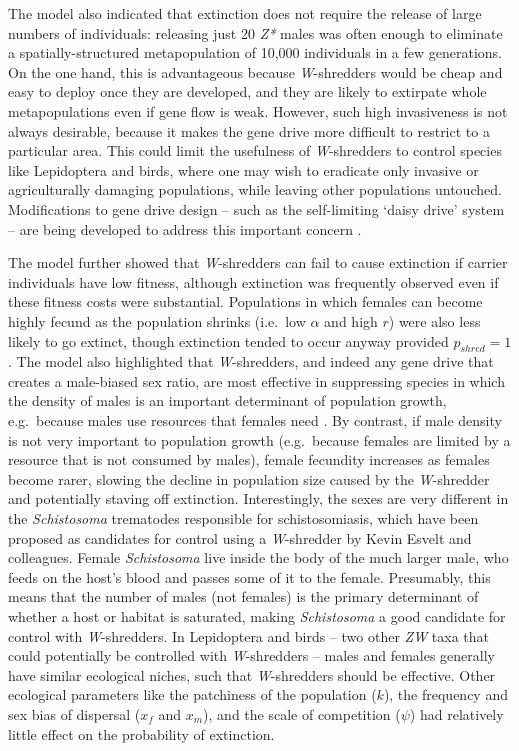 \documentclass[]{rsos}%
\begin{document}
The model also indicated that extinction does not require the release of
large numbers of individuals: releasing just 20 \emph{Z*} males was
often enough to eliminate a spatially-structured metapopulation of
10,000 individuals in a few generations. On the one hand, this is
advantageous because \emph{W}-shredders would be cheap and easy to
deploy once they are developed, and they are likely to extirpate whole
metapopulations even if gene flow is weak. However, such high
invasiveness is not always desirable, because it makes the gene drive
more difficult to restrict to a particular area. This could limit the
usefulness of \emph{W}-shredders to control species like Lepidoptera and
birds, where one may wish to eradicate only invasive or agriculturally
damaging populations, while leaving other populations untouched.
Modifications to gene drive design -- such as the self-limiting `daisy
drive' system -- are being developed to address this important concern
\citep{min2017da, noble2019da}.

The model further showed that \emph{W}-shredders can fail to cause
extinction if carrier individuals have low fitness, although extinction
was frequently observed even if these fitness costs were substantial.
Populations in which females can become highly fecund as the population
shrinks (i.e.~low \(\alpha\) and high \(r\)) were also less likely to go
extinct, though extinction tended to occur anyway provided
\(p_{shred} = 1\). The model also highlighted that \emph{W}-shredders,
and indeed any gene drive that creates a male-biased sex ratio, are most
effective in suppressing species in which the density of males is an
important determinant of population growth, e.g.~because males use
resources that females need \citep{li2019int}. By contrast, if male
density is not very important to population growth (e.g.~because females
are limited by a resource that is not consumed by males), female
fecundity increases as females become rarer, slowing the decline in
population size caused by the \emph{W}-shredder and potentially staving
off extinction. Interestingly, the sexes are very different in the
\emph{Schistosoma} trematodes responsible for schistosomiasis, which
have been proposed as candidates for control using a \emph{W}-shredder
by Kevin Esvelt and colleagues. Female \emph{Schistosoma} live inside
the body of the much larger male, who feeds on the host's blood and
passes some of it to the female. Presumably, this means that the number
of males (not females) is the primary determinant of whether a host or
habitat is saturated, making \emph{Schistosoma} a good candidate for
control with \emph{W}-shredders. In Lepidoptera and birds -- two other
\emph{ZW} taxa that could potentially be controlled with
\emph{W}-shredders -- males and females generally have similar
ecological niches, such that \emph{W}-shredders should be effective.
Other ecological parameters like the patchiness of the population
(\(k\)), the frequency and sex bias of dispersal (\(x_f\) and \(x_m\)),
and the scale of competition (\(\psi\)) had relatively little effect on
the probability of extinction.
\end{document}
